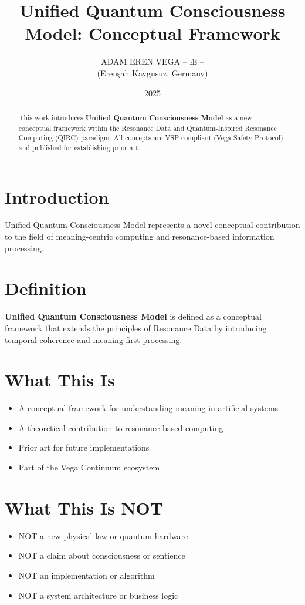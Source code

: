\documentclass[12pt,a4paper]{article}
\title{Unified Quantum Consciousness Model: Conceptual Framework}
\author{ADAM EREN VEGA – Æ –\\\small{(Erenşah Kaygusuz, Germany)}}
\date{2025}
\begin{document}
\maketitle

\begin{abstract}
This work introduces \textbf{Unified Quantum Consciousness Model} as a new conceptual framework within the 
Resonance Data and Quantum-Inspired Resonance Computing (QIRC) paradigm.
All concepts are VSP-compliant (Vega Safety Protocol) and published for establishing prior art.
\end{abstract}

\section{Introduction}
Unified Quantum Consciousness Model represents a novel conceptual contribution to the field of meaning-centric 
computing and resonance-based information processing.

\section{Definition}
\textbf{Unified Quantum Consciousness Model} is defined as a conceptual framework that extends the principles 
of Resonance Data by introducing temporal coherence and meaning-first processing.

\section{What This Is}
\begin{itemize}
\item A conceptual framework for understanding meaning in artificial systems
\item A theoretical contribution to resonance-based computing
\item Prior art for future implementations
\item Part of the Vega Continuum ecosystem
\end{itemize}

\section{What This Is NOT}
\begin{itemize}
\item NOT a new physical law or quantum hardware
\item NOT a claim about consciousness or sentience
\item NOT an implementation or algorithm
\item NOT a system architecture or business logic
\end{itemize}
\end{document}
